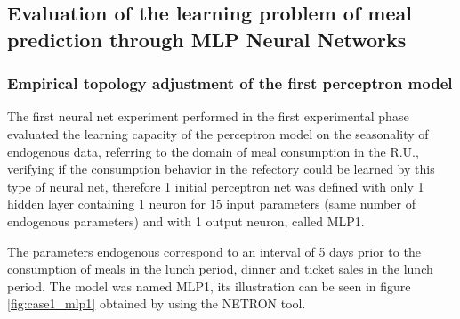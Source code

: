     \subsection{Evaluation of the learning problem of meal prediction through MLP Neural Networks}
        \subsubsection{Empirical topology adjustment of the first perceptron model}
        
        The first neural net experiment performed in the first experimental phase evaluated the learning capacity of the perceptron model on the seasonality of endogenous data, referring to the domain of meal consumption in the R.U., verifying if the consumption behavior in the refectory could be learned by this type of neural net, therefore 1 initial perceptron net was defined with only 1 hidden layer containing 1 neuron for 15 input parameters (same number of endogenous parameters) and with 1 output neuron, called MLP1.
        
        The parameters endogenous correspond to an interval of 5 days prior to the consumption of meals in the lunch period, dinner and ticket sales in the lunch period.
        The model was named MLP1, its illustration can be seen in figure \ref{fig:case1_mlp1} obtained by using the NETRON tool.  
        
        \begin{figure}[H]
        \end{figure}
        
